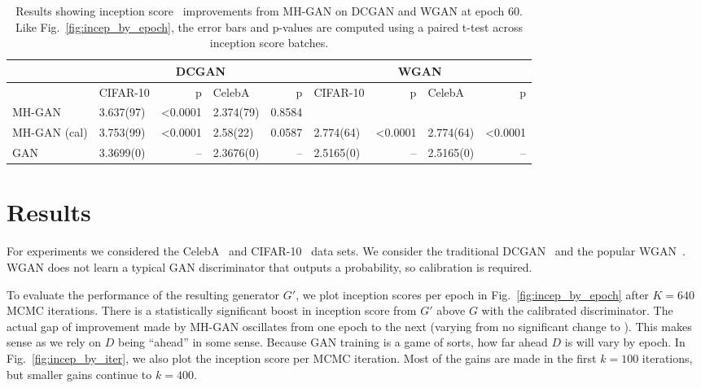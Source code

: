 \documentclass{article}
\begin{document}
\begin{table}[htbp]
\centering
    \caption{{\small
    Results showing inception score~\citep{Salimans2016} improvements from MH-GAN on DCGAN and WGAN at epoch 60.
    Like Fig.~\ref{fig:incep_by_epoch}, the error bars and p-values are computed using a paired t-test across inception score batches.
    }}
    \label{tbl:inception}
{\scriptsize
\begin{tabular}{|l|l|r|l|r||l|r|l|r|}
\toprule
~                 & \multicolumn{4}{c||}{DCGAN}                               & \multicolumn{4}{c|}{WGAN} \\
\toprule
~                 & CIFAR-10         &      p   & CelebA         &      p   & CIFAR-10        &       p   & CelebA        &       p  \\
\midrule
MH-GAN            &        3.637(97) &  <0.0001 &      2.374(79) &  0.8584  &              ~  &        ~  &            ~  &      ~   \\
MH-GAN (cal)      &        3.753(99) &  <0.0001 &      2.58(22)  &  0.0587  &       2.774(64) &   <0.0001 &     2.774(64) &  <0.0001 \\
GAN               &        3.3699(0) &       -- &      2.3676(0) &      --  &       2.5165(0) &        -- &     2.5165(0) &       -- \\
\bottomrule
\end{tabular}
}
\end{table}


\section{Results}
\label{sec:Results}

For experiments we considered the CelebA~\citep{Liu2015} and CIFAR-10~\citep{Torralba2008} data sets.
We consider the traditional DCGAN~\citep{Radford2015} and the popular WGAN~\citep{Arjovsky2017}\@.
WGAN does not learn a typical GAN discriminator that outputs a probability, so calibration is required.


To evaluate the performance of the resulting generator $G'$, we plot inception scores per epoch in Fig.~\ref{fig:incep_by_epoch} after $K=640$ MCMC iterations.
There is a statistically significant boost in inception score from $G'$ above $G$ with the calibrated discriminator.
The actual gap of improvement made by MH-GAN oscillates from one epoch to the next (varying from no significant change to )\@.
This makes sense as we rely on $D$ being ``ahead'' in some sense.
Because GAN training is a game of sorts, how far ahead $D$ is will vary by epoch.
In Fig.~\ref{fig:incep_by_iter}, we also plot the inception score per MCMC iteration.
Most of the gains are made in the first $k=100$ iterations, but smaller gains continue to $k=400$.
\end{document}
